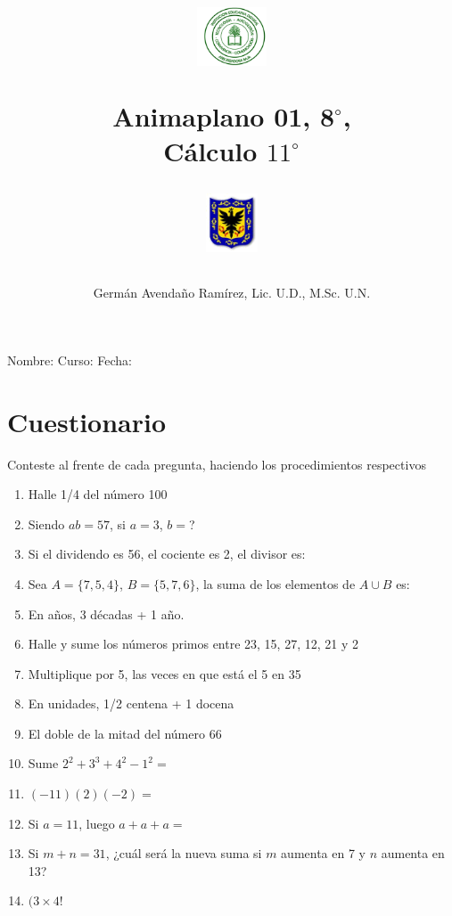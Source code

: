 \documentclass[10pt,twoside]{article}
\author{Germ\'an Avenda\~no Ram\'irez, Lic. U.D., M.Sc. U.N.}
\title{\begin{minipage}{.2\textwidth}
\includegraphics[height=1.75cm]{Images/logo-colegio.png}\end{minipage}
\begin{minipage}{.55\textwidth}
\begin{center}
Animaplano 01, 8$^{\circ}$,  \\
Cálculo $11^{\circ}$
\end{center}
\end{minipage}\hfill
\begin{minipage}{.2\textwidth}
\includegraphics[height=1.75cm]{Images/logo-sed.png} 
\end{minipage}}
\date{}
\begin{document}
\maketitle
Nombre: \hrulefill Curso: \underline{\hspace*{44pt}} Fecha: \underline{\hspace*{2.5cm}}
\section*{Cuestionario}
Conteste al frente de cada pregunta, haciendo los procedimientos respectivos
\begin{enumerate}
 \item Halle 1/4 del número 100
 \item Siendo $ab=57$, si $a=3$, $b=$?
 \item Si el dividendo es 56, el cociente es 2, el divisor es:
 \item Sea $A=\{7,5,4\}$, $B=\{5,7,6\}$, la suma de los elementos de $A\cup B$ es:
 \item En años, 3 décadas + 1 año.
 \item Halle y sume los números primos entre 23, 15, 27, 12, 21 y 2
 \item Multiplique por 5, las veces en que está el 5 en 35
 \item En unidades, 1/2 centena + 1 docena
 \item El doble de la mitad del número 66
 \item Sume $2^{2}+3^{3}+4^{2}-1^{2}=$
 \item $(-11)(2)(-2)=$
 \item Si $a=11$, luego $a+a+a=$
 \item Si $m+n=31$, ¿cuál será la nueva suma si $m$ aumenta en 7 y $n$ aumenta en 13?
 \item $(3\times4!$
\end{enumerate}
\end{document}
